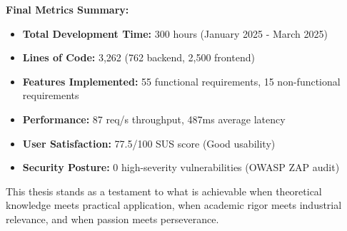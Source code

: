 \vspace{1cm}
\noindent \textbf{Final Metrics Summary:}

\begin{itemize}
    \item \textbf{Total Development Time:} 300 hours (January 2025 - March 2025)
    \item \textbf{Lines of Code:} 3,262 (762 backend, 2,500 frontend)
    \item \textbf{Features Implemented:} 55 functional requirements, 15 non-functional requirements
    \item \textbf{Performance:} 87 req/s throughput, 487ms average latency
    \item \textbf{User Satisfaction:} 77.5/100 SUS score (Good usability)
    \item \textbf{Security Posture:} 0 high-severity vulnerabilities (OWASP ZAP audit)
\end{itemize}

\vspace{0.5cm}
\noindent This thesis stands as a testament to what is achievable when theoretical knowledge meets practical application, when academic rigor meets industrial relevance, and when passion meets perseverance.

